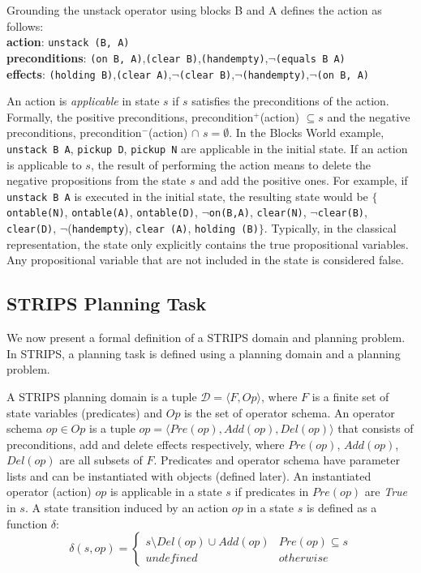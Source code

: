 \noindent Grounding the unstack operator using blocks B and A defines the action as follows:\\
\textbf{action}: \texttt{unstack (B, A)}\\[-0.5em]
\textbf{preconditions}: \texttt{(on B, A)},\texttt{(clear B)},\texttt{(handempty)},$\neg$\texttt{(equals B A)}\\[-0.5em]
\textbf{effects}: \texttt{(holding B)},\texttt{(clear A)},$\neg$\texttt{(clear B)},$\neg$\texttt{(handempty)},$\neg$\texttt{(on B, A)}

\noindent An action is \textit{applicable} in state $s$ if $s$ satisfies the preconditions of the action. Formally, the positive preconditions, precondition$^+$(action) $\subseteq s$ and the negative preconditions, precondition$^-$(action) $ \cap$ $s =\emptyset $. In the Blocks World example, \texttt{unstack B A}, \texttt{pickup D}, \texttt{pickup N} are applicable in the initial state. If an action is applicable to $s$, the result of performing the action means to delete the negative propositions from the state $s$ and add the positive ones. For example, if \texttt{unstack B A} is executed in the initial state, the resulting state would be $\lbrace$ \texttt{ontable(N)}, \texttt{ontable(A)}, \texttt{ontable(D)}, $\neg$\texttt{on(B,A)}, \texttt{clear(N)}, $\neg$\texttt{clear(B)}, \texttt{clear(D)}, $\neg$(\texttt{handempty}), \texttt{clear (A)}, \texttt{holding (B)}$\rbrace$. Typically, in the classical representation, the state only explicitly contains the true propositional variables. Any propositional variable that are not included in the state is considered false.


\subsection{STRIPS Planning Task}
We now present a formal definition of a STRIPS domain and planning problem. In STRIPS, a planning task is defined using a planning domain and a planning problem.
\begin{definition}
A STRIPS planning domain is a tuple $\mathcal{D}=\langle F, Op\rangle$, where $F$ is a finite set of  state variables (predicates) and $Op$ is the set of operator schema. An operator schema $op \in Op$ is a tuple $ op = \langle Pre(op), Add(op), Del(op)\rangle$ that consists of preconditions, add and delete effects respectively, where $Pre(op)$, $Add(op)$, $Del(op)$ are all subsets of $F$. Predicates and operator schema have parameter lists and can be instantiated with objects (defined later). An instantiated operator (action) $op$ is applicable in a state $s$ if predicates in $Pre(op)$ are \textit{True} in $s$. A state transition induced by an action $op$ in a state $s$ is defined as a function $\delta$:
\begin{equation*}
\delta (s,op) = \left\{\begin{matrix}
s\setminus Del(op) \cup Add(op) & Pre(op) \subseteq s\\ 
undefined & otherwise
\end{matrix}\right.
\end{equation*}
\end{definition}

